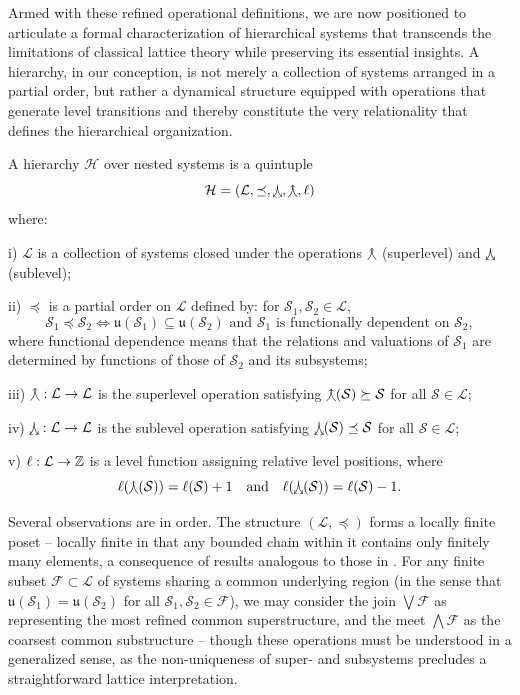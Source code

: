 Armed with these refined operational definitions, we are now positioned to articulate a formal characterization of hierarchical systems that transcends the limitations of classical lattice theory while preserving its essential insights. A hierarchy, in our conception, is not merely a collection of systems arranged in a partial order, but rather a dynamical structure equipped with operations that generate level transitions and thereby constitute the very relationality that defines the hierarchical organization.

\begin{definition}[Hierarchy] \label{def::hierarchy}
A hierarchy $\mathcal{H}$ over nested systems is a quintuple
\[\mathcal{H} = (\mathcal{L}, \preceq, \operatorname*{\curlywedgedownarrow}, \operatorname*{\curlywedgeuparrow}, \ell)\]
where:

\noindent
i) $\mathcal{L}$ is a collection of systems closed under the operations $\operatorname*{\curlywedgeuparrow}$ (superlevel) and $\operatorname*{\curlywedgedownarrow}$ (sublevel);

\noindent
ii) $\preceq$ is a partial order on $\mathcal{L}$ defined by: for $\mathcal{S}_1, \mathcal{S}_2 \in \mathcal{L}$,
\[\mathcal{S}_1 \preceq \mathcal{S}_2 \iff \mathfrak{u}(\mathcal{S}_1) \subseteq \mathfrak{u}(\mathcal{S}_2) \text{ and } \mathcal{S}_1 \text{ is functionally dependent on } \mathcal{S}_2,\]
where functional dependence means that the relations and valuations of $\mathcal{S}_1$ are determined by functions of those of $\mathcal{S}_2$ and its subsystems;

\noindent
iii) $\operatorname*{\curlywedgeuparrow} : \mathcal{L} \rightarrow \mathcal{L}$ is the superlevel operation satisfying $\operatorname*{\curlywedgeuparrow}(\mathcal{S}) \succeq \mathcal{S}$ for all $\mathcal{S} \in \mathcal{L}$;

\noindent
iv) $\operatorname*{\curlywedgedownarrow} : \mathcal{L} \rightarrow \mathcal{L}$ is the sublevel operation satisfying $\operatorname*{\curlywedgedownarrow}(\mathcal{S}) \preceq \mathcal{S}$ for all $\mathcal{S} \in \mathcal{L}$;

\noindent
v) $\ell : \mathcal{L} \rightarrow \mathbb{Z}$ is a level function assigning relative level positions, where
\[\ell(\operatorname*{\curlywedgeuparrow}(\mathcal{S})) = \ell(\mathcal{S}) + 1 \quad \text{and} \quad \ell(\operatorname*{\curlywedgedownarrow}(\mathcal{S})) = \ell(\mathcal{S}) - 1.\]
\end{definition}

Several observations are in order. The structure $(\mathcal{L}, \preceq)$ forms a locally finite poset -- locally finite in that any bounded chain within it contains only finitely many elements, a consequence of results analogous to those in \cite{Lin2002}. For any finite subset $\mathcal{F} \subset \mathcal{L}$ of systems sharing a common underlying region (in the sense that $\mathfrak{u}(\mathcal{S}_1) = \mathfrak{u}(\mathcal{S}_2)$ for all $\mathcal{S}_1, \mathcal{S}_2 \in \mathcal{F}$), we may consider the join $\bigvee \mathcal{F}$ as representing the most refined common superstructure, and the meet $\bigwedge \mathcal{F}$ as the coarsest common substructure -- though these operations must be understood in a generalized sense, as the non-uniqueness of super- and subsystems precludes a straightforward lattice interpretation.

